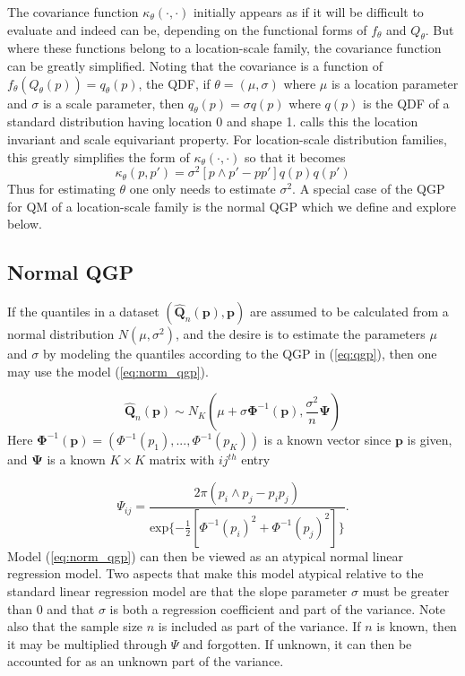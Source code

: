 The covariance function $\kappa_{\theta} (\cdot, \cdot)$ initially appears as 
if it will be difficult to evaluate and indeed can be, depending on the 
functional forms of $f_{\theta}$ and $Q_{\theta}$. But where these functions 
belong to a location-scale family, the covariance function can be greatly 
simplified. 
Noting that the covariance is a function of $f_{\theta}(Q_{\theta}(p)) = q_{\theta}(p)$, the QDF, if $\theta = (\mu, \sigma)$ where $\mu$ is a location parameter and $\sigma$ is a scale parameter, then $q_{\theta}(p) = \sigma q(p)$ where $q(p)$ is the QDF of a standard distribution having location 0 and shape 1. \cite{staudte2017shapes} calls this the location invariant and scale equivariant property. For location-scale distribution families, this greatly simplifies the form of $\kappa_{\theta}(\cdot,\cdot)$ so that it becomes
\[
    \kappa_{\theta}(p, p') = \sigma^{2}[p\wedge p' - p p'] q(p)q(p') 
\] 
Thus for estimating $\theta$ one only needs to estimate $\sigma^2$. A special 
case of the QGP for QM of a location-scale family is the normal QGP which we 
define and explore below.


\subsection{Normal QGP}

If the quantiles in a dataset 
$(\hat{\boldsymbol{Q}}_n(\boldsymbol{p}),\boldsymbol{p})$ are assumed to be 
calculated from a normal distribution $N(\mu, \sigma^2)$, and the desire is to 
estimate the parameters $\mu$ and $\sigma$ by modeling the quantiles according 
to the QGP in (\ref{eq:qgp}), then one may use the model (\ref{eq:norm_qgp}). 

\begin{equation}
    \label{eq:norm_qgp}
\hat{\boldsymbol{Q}}_n(\boldsymbol{p}) \sim N_K 
\left( \mu + \sigma \boldsymbol{\Phi}^{-1}(\boldsymbol{p}),\frac{\sigma^2}{n} 
\boldsymbol{\Psi} \right)
\end{equation}
Here $\boldsymbol{\Phi}^{-1}(\boldsymbol{p}) = (\Phi^{-1}(p_1), ..., 
\Phi^{-1}(p_K))$ is a known vector since $\boldsymbol{p}$ is given, and 
$\boldsymbol{\Psi}$ is a known $K\times K$ matrix with $ij^{th}$ entry

\[
    \Psi_{ij} = \frac{2 \pi (p_i\wedge p_j - p_i p_j)}{\text{exp}\{-\frac{1}{2}[\Phi^{-1}(p_i)^2 + \Phi^{-1}(p_j)^2]\}}.
\]
Model (\ref{eq:norm_qgp}) can then be viewed as an atypical normal linear 
regression model. Two aspects that make this model atypical relative to the 
standard linear regression model are that the slope parameter $\sigma$ must be 
greater than 0 and that $\sigma$ is both a regression coefficient and part of 
the variance.
Note also that the sample size $n$ is included as part of the variance. If $n$ 
is known, then it may be multiplied through $\Psi$ and forgotten. If unknown, 
it can then be accounted for as an unknown part of the variance. 

